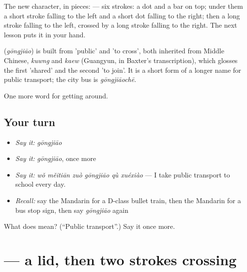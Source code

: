 The new character, in pieces:  — six strokes: a dot and a bar on top; under them a short stroke falling to the left and a short dot falling to the right; then a long stroke falling to the left, crossed by a long stroke falling to the right. The next lesson puts it in your hand.

\begin{cousinweb}
\textbf{} (\emph{gōngjiāo}) is built from  'public' and  'to cross', both inherited from Middle Chinese, \emph{kuwng} and \emph{kaew} (Guangyun, in Baxter's transcription), which glosses the first 'shared' and the second 'to join'. It is a short form of a longer name for public transport; the city bus is \emph{gōngjiāochē}.
\end{cousinweb}

\begin{grammarlens}[title={What you've built}]
One more word for getting around.
\end{grammarlens}

\subsection*{Your turn}
\begin{itemize}
\raggedright
  \item \emph{Say it:} \emph{gōngjiāo}
  \item \emph{Say it:} \emph{gōngjiāo}, once more
  \item \emph{Say it:} \emph{wǒ měitiān zuò gōngjiāo qù xuéxiào} — I take public transport to school every day.
  \item \emph{Recall:} say the Mandarin for a D-class bullet train, then the Mandarin for a bus stop sign, then say \emph{gōngjiāo} again
\end{itemize}

\begin{tcolorbox}[breakable,colback=teal!4,colframe=teal!35!black,title={Before you move on}]
What does  mean? (\textquotedblleft{}Public transport\textquotedblright{}.) Say it once more.
\end{tcolorbox}
\section[\texorpdfstring{\zh{交} (jiāo)}{交 (jiāo)}]{ — a lid, then two strokes crossing}

\label{lesson:ZH-W408-jiao-cross}



